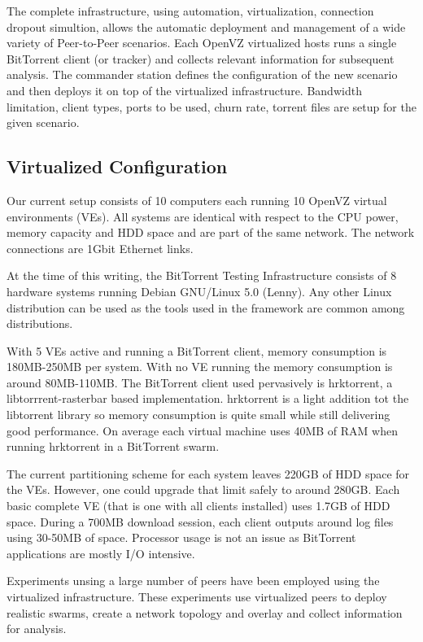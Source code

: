 The complete infrastructure, using automation, virtualization, connection
dropout simultion, allows the automatic deployment and management of a wide
variety of Peer-to-Peer scenarios. Each OpenVZ virtualized hosts runs a single
BitTorrent client (or tracker) and collects relevant information for
subsequent analysis. The commander station defines the configuration of the
new scenario and then deploys it on top of the virtualized infrastructure.
Bandwidth limitation, client types, ports to be used, churn rate, torrent
files are setup for the given scenario.

\subsection{Virtualized Configuration}

Our current setup consists of 10 computers each running 10 OpenVZ virtual
environments (VEs). All systems are  identical with respect to the CPU power,
memory capacity and HDD space and are part of the same network. The network
connections are 1Gbit Ethernet links.

At the time of this writing, the BitTorrent Testing Infrastructure consists of
8 hardware systems running Debian GNU/Linux 5.0 (Lenny). Any other Linux
distribution can be used as the tools used in the framework are common among
distributions.

With 5 VEs active and running a BitTorrent client, memory consumption is
180MB-250MB per system. With no VE running the memory consumption is around
80MB-110MB. The BitTorrent client used pervasively is hrktorrent, a
libtorrrent-rasterbar based implementation. hrktorrent is a light addition tot
the libtorrent library so memory consumption is quite small while still
delivering good performance. On average each virtual machine uses 40MB of RAM
when running hrktorrent in a BitTorrent swarm.

The current partitioning scheme for each system leaves 220GB of HDD space for
the VEs. However, one could upgrade that limit safely to around 280GB. Each
basic complete VE (that is one with all clients installed) uses 1.7GB of HDD
space. During a 700MB download session, each client outputs around log files
using 30-50MB of space. Processor usage is not an issue as BitTorrent
applications are mostly I/O intensive.

Experiments unsing a large number of peers have been employed using the
virtualized infrastructure. These experiments use virtualized peers to deploy
realistic swarms, create a network topology and overlay and collect
information for analysis.

